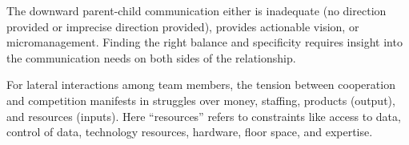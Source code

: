 The downward parent-child communication either is inadequate (no direction provided or imprecise direction provided), provides actionable vision, or micromanagement. Finding the right balance and specificity requires insight into the communication needs on both sides of the relationship. 

For lateral interactions among team members, the tension between cooperation and competition manifests in struggles over money, staffing, products (output), and resources (inputs). Here ``resources''  refers to constraints like access to data, control of data, technology resources, hardware, floor space, and expertise. 


